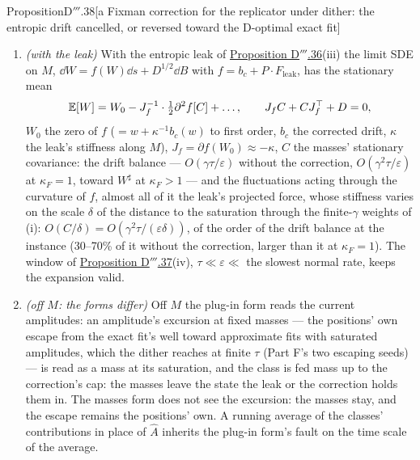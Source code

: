 \begin{thm}{Proposition}{D$'''$.38}[a Fixman correction for the replicator under dither: the entropic drift cancelled,
or reversed toward the D-optimal exact fit]
\begin{enumerate}[label=\textup{(\roman*)}]
    threshold below, where the description in $W$ ends anyway). At finite $\tau$ the law needs
    $\delta\gg(\kappa_F\tau/(ma_{\max}^2\Gamma_{kk}))^{1/2}$ ($\Gamma_{kk} = \langle\varphi_k^2\rangle_\rho$;
    $0.003\sqrt{\kappa_F}$ for the first class on the instance): there the fit's overshoot, through which the masses
    relax, leaves $a'_k$ at its value on $M$ and the two forms agree.
  \item \emph{(with the leak)} With the entropic leak of \hyperref[res:thmDppp:36]{Proposition D$'''$.36}(iii) the
    limit SDE on $M$, $\dd W = f(W)\dd s + D^{1/2}\dd B$ with $f = b_c + P\cdot F_{\mathrm{leak}}$, has the stationary
    mean
    \[
      \mathbb{E}[W] = W_0 - J_f^{-1}\cdot\tfrac12\partial^2f[C] + \dots,\qquad J_fC + CJ_f^\top + D = 0,
    \]
    $W_0$ the zero of $f$ ($= w + \kappa^{-1}b_c(w)$ to first order, $b_c$ the corrected drift, $\kappa$ the leak's
    stiffness along $M$), $J_f = \partial f(W_0)\approx-\kappa$, $C$ the masses' stationary covariance: the drift
    balance --- $O(\gamma\tau/\varepsilon)$ without the correction, $O(\gamma^2\tau/\varepsilon)$ at $\kappa_F = 1$,
    toward $W^\sharp$ at $\kappa_F > 1$ --- and the fluctuations acting through the curvature of $f$, almost all of it
    the leak's projected force, whose stiffness varies on the scale $\delta$ of the distance to the saturation through
    the finite-$\gamma$ weights of (i): $O(C/\delta) = O(\gamma^2\tau/(\varepsilon\delta))$, of the order of the drift
    balance at the instance (30--70\% of it without the correction, larger than it at $\kappa_F = 1$). The window of
    \hyperref[res:thmDppp:37]{Proposition D$'''$.37}(iv), $\tau\ll\varepsilon\ll{}$ the slowest normal rate, keeps the
    expansion valid.
  \item \emph{(off $M$: the forms differ)} Off $M$ the plug-in form reads the current amplitudes: an amplitude's
    excursion at fixed masses --- the positions' own escape from the exact fit's well toward approximate fits with
    saturated amplitudes, which the dither reaches at finite $\tau$ (Part F's two escaping seeds) --- is read as a mass
    at its saturation, and the class is fed mass up to the correction's cap: the masses leave the state the leak or the
    correction holds them in. The masses form does not see the excursion: the masses stay, and the escape remains the
    positions' own. A running average of the classes' contributions in place of $\hat A$ inherits the plug-in form's
    fault on the time scale of the average.
\end{enumerate}
\end{thm}

